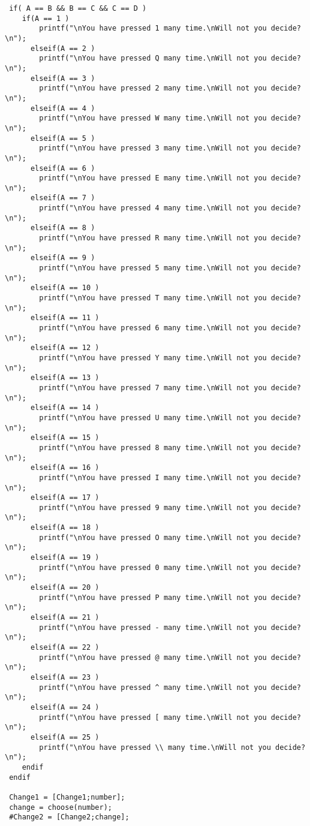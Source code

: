 {\begin{verbatim}
 if( A == B && B == C && C == D )
    if(A == 1 )
        printf("\nYou have pressed 1 many time.\nWill not you decide?\n");
      elseif(A == 2 ) 
        printf("\nYou have pressed Q many time.\nWill not you decide?\n");
      elseif(A == 3 ) 
        printf("\nYou have pressed 2 many time.\nWill not you decide?\n");
      elseif(A == 4 ) 
        printf("\nYou have pressed W many time.\nWill not you decide?\n");
      elseif(A == 5 ) 
        printf("\nYou have pressed 3 many time.\nWill not you decide?\n");
      elseif(A == 6 ) 
        printf("\nYou have pressed E many time.\nWill not you decide?\n");
      elseif(A == 7 ) 
        printf("\nYou have pressed 4 many time.\nWill not you decide?\n");
      elseif(A == 8 ) 
        printf("\nYou have pressed R many time.\nWill not you decide?\n");
      elseif(A == 9 ) 
        printf("\nYou have pressed 5 many time.\nWill not you decide?\n");
      elseif(A == 10 )
        printf("\nYou have pressed T many time.\nWill not you decide?\n");
      elseif(A == 11 )
        printf("\nYou have pressed 6 many time.\nWill not you decide?\n");
      elseif(A == 12 ) 
        printf("\nYou have pressed Y many time.\nWill not you decide?\n");
      elseif(A == 13 ) 
        printf("\nYou have pressed 7 many time.\nWill not you decide?\n");
      elseif(A == 14 ) 
        printf("\nYou have pressed U many time.\nWill not you decide?\n");
      elseif(A == 15 ) 
        printf("\nYou have pressed 8 many time.\nWill not you decide?\n");
      elseif(A == 16 ) 
        printf("\nYou have pressed I many time.\nWill not you decide?\n");
      elseif(A == 17 ) 
        printf("\nYou have pressed 9 many time.\nWill not you decide?\n");
      elseif(A == 18 ) 
        printf("\nYou have pressed O many time.\nWill not you decide?\n");
      elseif(A == 19 ) 
        printf("\nYou have pressed 0 many time.\nWill not you decide?\n");
      elseif(A == 20 )
        printf("\nYou have pressed P many time.\nWill not you decide?\n");
      elseif(A == 21 )
        printf("\nYou have pressed - many time.\nWill not you decide?\n");
      elseif(A == 22 ) 
        printf("\nYou have pressed @ many time.\nWill not you decide?\n");
      elseif(A == 23 ) 
        printf("\nYou have pressed ^ many time.\nWill not you decide?\n");
      elseif(A == 24 ) 
        printf("\nYou have pressed [ many time.\nWill not you decide?\n");
      elseif(A == 25 ) 
        printf("\nYou have pressed \\ many time.\nWill not you decide?\n");
    endif
 endif

 Change1 = [Change1;number];
 change = choose(number);
 #Change2 = [Change2;change];
 

\end{verbatim}}
